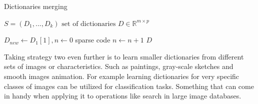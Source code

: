 \begin{algorithm}[H]
\caption{Dictionaries merging}
\label{alg:merging}
\begin{algorithmic}[1]
\REQUIRE $ S = (D_1,...,D_k) \text{ set of dictionaries } D \in
\mathbb{R}^{m\times p}$

\STATE $D_{new} \gets D_{1}[1], n \gets 0$
\STATE sparse code 
\STATE $n \gets n+1$
\ENDFOR
\ENDFOR
\RETURN $D$
\end{algorithmic}
\end{algorithm}

Taking strategy two even further is to learn smaller dictionaries from different
sets of images or characteristics. Such as paintings, gray-scale sketches and
smooth images animation. For example learning dictionaries for very specific
classes of images can be utilized for classification tasks. Something that can
come in handy when applying it to operations like search in large image
databases.


